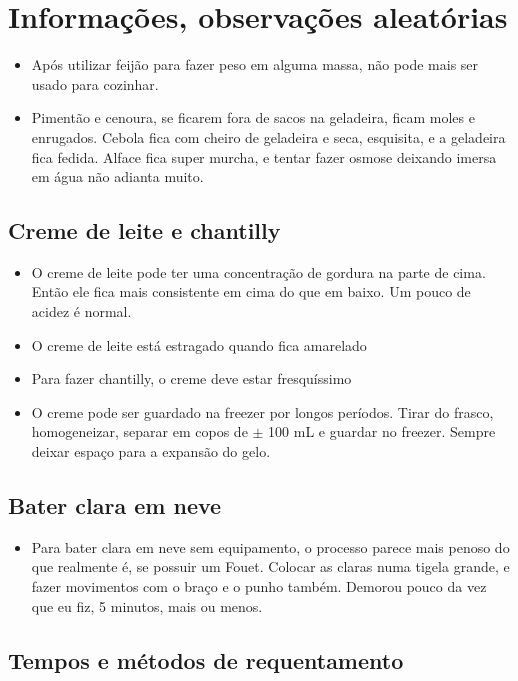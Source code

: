 \section{Informações, observações aleatórias}

\begin{itemize}
	\item Após utilizar feijão para fazer peso em alguma massa, não pode mais ser usado para cozinhar.
	\item Pimentão e cenoura, se ficarem fora de sacos na geladeira, ficam moles e enrugados. Cebola fica com
	      cheiro de geladeira e seca, esquisita, e a geladeira fica fedida. Alface fica super murcha, e tentar fazer
	      osmose deixando imersa em água não adianta muito.
\end{itemize}

\subsection*{Creme de leite e chantilly}
\begin{itemize}
	\item O creme de leite pode ter uma concentração de gordura na parte de cima. Então ele fica mais
	      consistente em cima do que em baixo. Um pouco de acidez é normal.
	\item O creme de leite está estragado quando fica amarelado
	\item Para fazer chantilly, o creme deve estar fresquíssimo
	\item O creme pode ser guardado na freezer por longos períodos. Tirar do frasco, homogeneizar, separar em
	      copos de $\pm$ 100 mL e guardar no freezer. Sempre deixar espaço para a expansão do gelo.
\end{itemize}

\subsection*{Bater clara em neve}
\begin{itemize}
	\item Para bater clara em neve sem equipamento, o processo parece mais penoso do que realmente é, se possuir
	      um Fouet. Colocar as claras numa tigela grande, e fazer movimentos com o braço e o punho também. Demorou
	      pouco da vez que eu fiz, 5 minutos, mais ou menos.
\end{itemize}

\subsection*{Tempos e métodos de requentamento}

